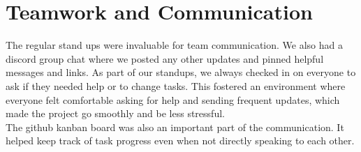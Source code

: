 \section{Teamwork and Communication}
The regular stand ups were invaluable for team communication. We also had a discord group chat where we posted any other updates and pinned helpful messages and links. As part of our standups, we always checked in on everyone to ask if they needed help or to change tasks. This fostered an environment where everyone felt comfortable asking for help and sending frequent updates, which made the project go smoothly and be less stressful. \\
The github kanban board was also an important part of the communication. It helped keep track of task progress even when not directly speaking to each other. 

